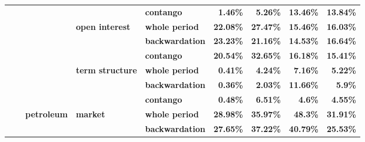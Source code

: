 \documentclass[
  authoryear,
  preprint,
  3p]{elsarticle}
\begin{document}
\begin{longtable}[t]{>{}l>{}l>{}l>{}l>{}l>{}r>{}r>{}r>{}r}
\textbf{} & \textbf{} & \textbf{} & \textbf{} & \textbf{contango} & \textcolor[HTML]{4285f4}{\textbf{1.46\%}} & \textcolor[HTML]{4285f4}{\textbf{5.26\%}} & \textcolor[HTML]{4285f4}{\textbf{13.46\%}} & \textcolor[HTML]{4285f4}{\textbf{13.84\%}}\\
\addlinespace
\textbf{} & \textbf{} & \textbf{} & \textbf{open interest} & \textbf{whole period} & \textcolor[HTML]{4285f4}{\textbf{22.08\%}} & \textcolor[HTML]{4285f4}{\textbf{27.47\%}} & \textcolor[HTML]{4285f4}{\textbf{15.46\%}} & \textcolor[HTML]{4285f4}{\textbf{16.03\%}}\\
\textbf{} & \textbf{} & \textbf{} & \textbf{} & \textbf{backwardation} & \textcolor[HTML]{4285f4}{\textbf{23.23\%}} & \textcolor[HTML]{4285f4}{\textbf{21.16\%}} & \textcolor[HTML]{4285f4}{\textbf{14.53\%}} & \textcolor[HTML]{4285f4}{\textbf{16.64\%}}\\
\textbf{} & \textbf{} & \textbf{} & \textbf{} & \textbf{contango} & \textcolor[HTML]{4285f4}{\textbf{20.54\%}} & \textcolor[HTML]{4285f4}{\textbf{32.65\%}} & \textcolor[HTML]{4285f4}{\textbf{16.18\%}} & \textcolor[HTML]{4285f4}{\textbf{15.41\%}}\\
\textbf{} & \textbf{} & \textbf{} & \textbf{term structure} & \textbf{whole period} & \textcolor[HTML]{4285f4}{\textbf{0.41\%}} & \textcolor[HTML]{4285f4}{\textbf{4.24\%}} & \textcolor[HTML]{4285f4}{\textbf{7.16\%}} & \textcolor[HTML]{4285f4}{\textbf{5.22\%}}\\
\textbf{} & \textbf{} & \textbf{} & \textbf{} & \textbf{backwardation} & \textcolor[HTML]{4285f4}{\textbf{0.36\%}} & \textcolor[HTML]{4285f4}{\textbf{2.03\%}} & \textcolor[HTML]{4285f4}{\textbf{11.66\%}} & \textcolor[HTML]{4285f4}{\textbf{5.9\%}}\\
\addlinespace
\textbf{} & \textbf{} & \textbf{} & \textbf{} & \textbf{contango} & \textcolor[HTML]{4285f4}{\textbf{0.48\%}} & \textcolor[HTML]{4285f4}{\textbf{6.51\%}} & \textcolor[HTML]{4285f4}{\textbf{4.6\%}} & \textcolor[HTML]{4285f4}{\textbf{4.55\%}}\\
\textbf{} & \textbf{} & \textbf{petroleum} & \textbf{market} & \textbf{whole period} & \textcolor[HTML]{4285f4}{\textbf{28.98\%}} & \textcolor[HTML]{4285f4}{\textbf{35.97\%}} & \textcolor[HTML]{4285f4}{\textbf{48.3\%}} & \textcolor[HTML]{4285f4}{\textbf{31.91\%}}\\
\textbf{} & \textbf{} & \textbf{} & \textbf{} & \textbf{backwardation} & \textcolor[HTML]{4285f4}{\textbf{27.65\%}} & \textcolor[HTML]{4285f4}{\textbf{37.22\%}} & \textcolor[HTML]{4285f4}{\textbf{40.79\%}} & \textcolor[HTML]{4285f4}{\textbf{25.53\%}}\\

\end{longtable}
\end{document}
